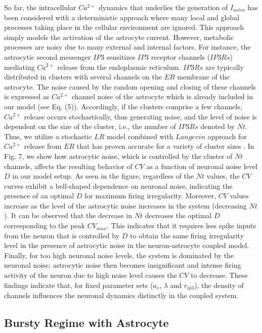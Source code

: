 \documentclass[%
 aip,
 amsmath,amssymb,
 reprint,%
]{revtex4-1}
\begin{document}
	So far, the intracellular $Ca^{2+}$ dynamics that underlies the generation of $I_{astro}$ has been considered with a deterministic approach where many local and global processes taking place in the cellular environment are ignored. This approach simply models the activation of the astrocyte current. However, metabolic processes are noisy due to many external and internal factors. For instance, the astrocytic second messenger $IP3$ sensitizes $IP3$ receptor channels ($IP3Rs$) mediating $Ca^{2+}$ release from the endoplasmic reticulum. $IP3Rs$ are typically distributed in clusters with several channels on the $ER$ membrane of the astrocyte. The noise caused by the random opening and closing of these channels is expressed as $Ca^{2+}$ channel noise of the astrocyte which is already included in our model (see Eq. (5)). Accordingly, if the clusters comprise a few channels,  $Ca^{2+}$ release occurs stochastically, thus generating noise, and the level of noise is dependent on the  size of the cluster, i.e., the number of $IP3Rs$ denoted by $Nt$. Thus, we utilize a stochastic $LR$ model combined with $Langevin$ approach  for $Ca^{2+}$ release from $ER$ that has proven accurate for a variety of cluster sizes  \cite {nadkarni2007}. In Fig. 7, we show how astrocytic noise, which is controlled by the cluster of $Nt$ channels,  affects the resulting behavior of $CV$ as a function of neuronal noise level $D$ in our model setup. As seen in the figure, regardless of the $Nt$ values, the $CV$ curves exhibit a bell-shaped  dependence on neuronal noise, indicating the presence of an optimal $D$ for maximum firing irregularity. Moreover, $CV$ values increase as the level of the astrocytic noise increases in the system (decreasing $Nt$). It can be observed that the decrease in $Nt$ decreases the optimal $D$  corresponding to the peak $CV_{max}$. This indicates that it requires less spike inputs from the neuron that is controlled by $D$ to obtain the same firing irregularity level in the presence of astrocytic noise in the neuron-astrocyte coupled model. Finally, for too high neuronal noise levels, the system is dominated by the neuronal noise; astrocytic noise then becomes insignificant and intense firing activity of the neuron due to high noise level causes the $CV$ to decrease. These findings indicate that, for fixed parameter sets ($a_{e}$, $\lambda$ and $r_{ip3}$), the density of channels influences the neuronal dynamics distinctly in the coupled system. 
	


	
	\subsection {Bursty Regime with Astrocyte}
	
\end{document}
